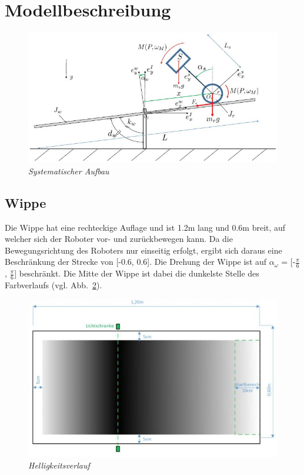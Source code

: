 \documentclass[pdf]{ifacconf}
\begin{document}
\section{Modellbeschreibung}
\begin{figure}[h]	
\centerline{\includegraphics[width=\linewidth]{Bilder/SystematischerAufbau.jpg}}
	\label{fig:theFig}
	\caption{\textit{Systematischer Aufbau}}
\end{figure}


	\subsection{Wippe}
	Die Wippe hat eine rechteckige Auflage und ist 1.2m lang und 0.6m breit, auf 			welcher sich der Roboter vor- und zurückbewegen kann.
	Da die Bewegungsrichtung des Roboters nur einseitig erfolgt, ergibt sich daraus 		eine Beschränkung der Strecke von [-0.6, 0.6].
	Die Drehung der Wippe ist auf $\alpha^{}_{\omega}$ = [-$\frac{\pi}{6}$, $\frac{\pi}{6}$] beschränkt.
	Die Mitte der Wippe ist dabei die dunkelste Stelle des Farbverlaufs (vgl. Abb.~\ref{Helligkeit}).
	
	
	\begin{figure}[h]	
	\centerline{\includegraphics[width=\linewidth]{Bilder/Farbverlauf.jpg}}
	\label{Helligkeit}
	\caption{\textit{Helligkeitsverlauf}}
	\end{figure}
	
\end{document}
